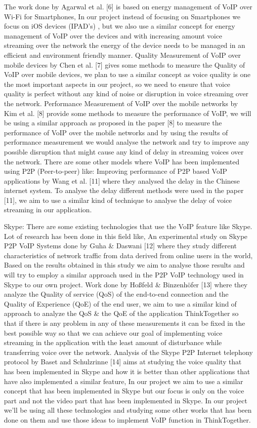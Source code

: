 The work done by Agarwal et al. [6] is based on energy management of VoIP over Wi-Fi for Smartphones, In our project instead of focusing on Smartphones we focus on iOS devices (IPAD’s) , but we also use a similar concept for energy management of VoIP over the devices and with increasing amount voice streaming over the network the energy of the device needs to be managed in an efficient and environment friendly manner.  Quality Measurement of VoIP over mobile devices by Chen et al. [7] gives some methods to measure the Quality of VoIP over mobile devices, we plan to use a similar concept as voice quality is one the most important aspects in our project, so we need to ensure that voice quality is perfect without any kind of noise or disruption in voice streaming over the network. Performance Measurement of VoIP over the mobile networks by Kim et al. [8] provide some methods to measure the performance of VoIP, we will be using a similar approach as proposed in the paper [8] to measure the performance of VoIP over the mobile networks and by using the results of performance measurement we would analyse the network and try to improve any possible disruption that might cause any kind of delay in streaming voices over the network.
There are some other models where VoIP has been implemented using P2P (Peer-to-peer) like: Improving performance of P2P based VoIP applications by Wang et al. [11] where they analysed the delay in the Chinese internet system. To analyse the delay different methods were used in the paper [11], we aim to use a similar kind of technique to analyse the delay of voice streaming in our application.


Skype:
There are some existing technologies that use the VoIP feature like Skype. Lot of research has been done in this field like, An experimental study on Skype P2P VoIP Systems done by Guha \& Daswani [12] where they study different characteristics of network traffic from data derived from online users in the world, Based on the results obtained in this study we aim to analyse those results and will try to employ a similar approach used in the P2P VoIP technology used in Skype to our own project. Work  done by Hoßfeld \& Binzenhöfer [13] where they analyze the Quality of service (QoS) of the end-to-end connection and the Quality of Experience (QoE) of the end user, we aim to use a similar kind of approach to analyze the QoS \& the QoE of the application ThinkTogether so that if there is any problem in any of these measurements it can be fixed in the best possible way so that we can achieve our goal of implementing voice streaming in the application with the least amount of disturbance while transferring voice over the network. Analysis of the Skype P2P Internet telephony protocol by Baset and Schulzrinne [14] aims at studying the voice quality that has been implemented in Skype and how it is better than other applications that have also implemented a similar feature, In our project we aim to use a similar concept that has been implemented in Skype but our focus is only on the voice part and not the video part that has been implemented in Skype.
In our project we'll be using all these technologies and studying some other works that has been  done on them and use those ideas to implement VoIP function in ThinkTogether.


